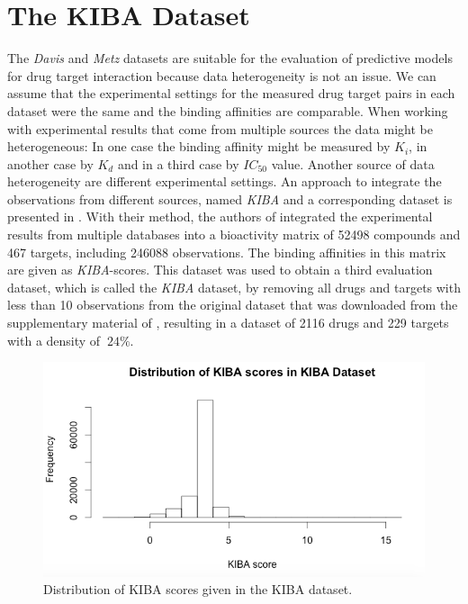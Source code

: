 \section{The KIBA Dataset}

The \textit{Davis} and \textit{Metz} datasets are suitable for the evaluation of predictive models for drug target interaction because data heterogeneity is not an issue. We can assume that the experimental settings for the measured drug target pairs in each dataset were the same and the binding affinities are comparable. When working with experimental results that come from multiple sources the data might be heterogeneous: In one case the binding affinity might be measured by $K_i$, in another case by $K_d$ and in a third case by $IC_{50}$ value. Another source of data heterogeneity are different experimental settings. An approach to integrate the observations from different sources, named \textit{KIBA} and a corresponding dataset is presented in \cite{tang2014making}. With their method, the authors of \cite{tang2014making} integrated the experimental results from multiple databases into a bioactivity matrix of 52498 compounds and 467 targets, including 246088 observations. The binding affinities in this matrix are given as \textit{KIBA}-scores. This dataset was used to obtain a third evaluation dataset, which is called the \textit{KIBA} dataset, by removing all drugs and targets with less than 10 observations from the original dataset that was downloaded from the supplementary material of \cite{tang2014making}, resulting in a dataset of 2116 drugs and 229 targets with a density of $~24\%$.

\begin{figure}
\begin{center}
\includegraphics[scale=0.6]{kiba_dist.png}
\end{center}
\caption{Distribution of KIBA scores given in the KIBA dataset.}
\label{fig:numStructure}
\end{figure}
